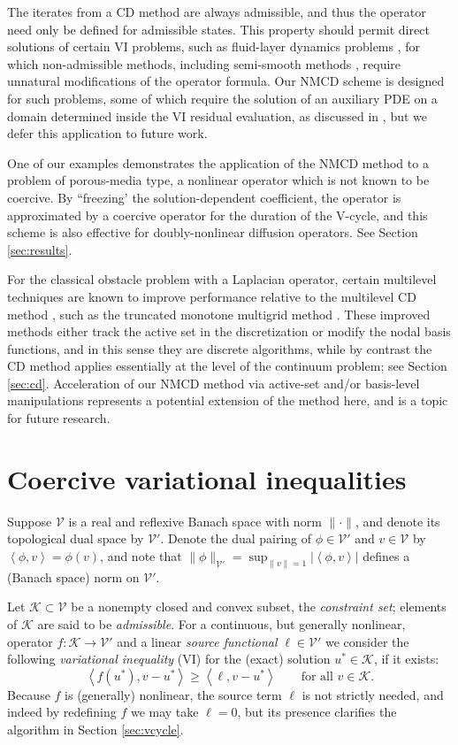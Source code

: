 \documentclass[letterpaper,final,12pt,reqno]{amsart}
\theoremstyle{cstyle}
\theoremstyle{cstyle*}
\theoremstyle{dstyle}
\numberwithin{equation}{section}
\numberwithin{figure}{section}
\numberwithin{table}{section}
\numberwithin{theorem}{section}
\newcommand{\cK}{\mathcal{K}}
\newcommand{\cV}{\mathcal{V}}
\newcommand{\ip}[2]{\left<#1,#2\right>}
\begin{document}
The iterates from a CD method are always admissible, and thus the operator need only be defined for admissible states.  This property should permit direct solutions of certain VI problems, such as fluid-layer dynamics problems \cite{Bueler2021conservation,JouvetBueler2012}, for which non-admissible methods, including semi-smooth methods \cite{BensonMunson2006}, require unnatural modifications of the operator formula.  Our NMCD scheme is designed for such problems, some of which require the solution of an auxiliary PDE on a domain determined inside the VI residual evaluation, as discussed in \cite{Bueler2021conservation}, but we defer this application to future work.

One of our examples demonstrates the application of the NMCD method to a problem of porous-media type, a nonlinear operator which is not known to be coercive.  By ``freezing' the solution-dependent coefficient, the operator is approximated by a coercive operator for the duration of the V-cycle, and this scheme is also effective for doubly-nonlinear diffusion operators.  See Section \ref{sec:results}.

For the classical obstacle problem with a Laplacian operator, certain multilevel techniques are known to improve performance relative to the multilevel CD method \cite{GraeserKornhuber2009}, such as the truncated monotone multigrid method \cite{Kornhuber1994}.  These improved methods either track the active set in the discretization or modify the nodal basis functions, and in this sense they are discrete algorithms, while by contrast the CD method applies essentially at the level of the continuum problem; see Section \ref{sec:cd}.  Acceleration of our NMCD method via active-set and/or basis-level manipulations represents a potential extension of the method here, and is a topic for future research.


\section{Coercive variational inequalities} \label{sec:vi}

Suppose $\cV$ is a real and reflexive Banach space with norm $\|\cdot\|$, and denote its topological dual space by $\cV'$.  Denote the dual pairing of $\phi \in \cV'$ and $v\in\cV$ by $\ip{\phi}{v} = \phi(v)$, and note that $\|\phi\|_{\cV'} = \sup_{\|v\|=1} |\ip{\phi}{v}|$ defines a (Banach space) norm on $\cV'$.

Let $\cK \subset \cV$ be a nonempty closed and convex subset, the \emph{constraint set}; elements of $\cK$ are said to be \emph{admissible}.  For a continuous, but generally nonlinear, operator $f:\cK \to \cV'$ and a linear \emph{source functional} $\ell\in \cV'$ we consider the following \emph{variational inequality} (VI) for the (exact) solution $u^*\in \cK$, if it exists:
\begin{equation}
\ip{f(u^*)}{v-u^*} \ge \ip{\ell}{v-u^*} \qquad \text{for all } v\in \cK. \label{eq:vi}
\end{equation}
Because $f$ is (generally) nonlinear, the source term $\ell$ is not strictly needed, and indeed by redefining $f$ we may take $\ell=0$, but its presence clarifies the algorithm in Section \ref{sec:vcycle}.
\end{document}
